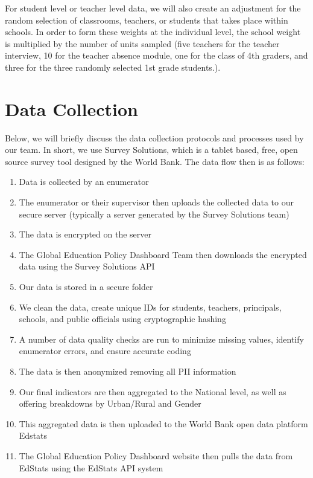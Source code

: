 \documentclass[]{article}
\providecommand{\tightlist}{%
  \setlength{\itemsep}{0pt}\setlength{\parskip}{0pt}}
\begin{document}
For student level or teacher level data, we will also create an
adjustment for the random selection of classrooms, teachers, or students
that takes place within schools. In order to form these weights at the
individual level, the school weight is multiplied by the number of units
sampled (five teachers for the teacher interview, 10 for the teacher
absence module, one for the class of 4th graders, and three for the
three randomly selected 1st grade students.).

\hypertarget{data-collection}{%
\section{Data Collection}\label{data-collection}}

Below, we will briefly discuss the data collection protocols and
processes used by our team. In short, we use Survey Solutions, which is
a tablet based, free, open source survey tool designed by the World
Bank. The data flow then is as follows:

\begin{enumerate}
\def\labelenumi{\arabic{enumi}.}
\tightlist
\item
  Data is collected by an enumerator\\
\item
  The enumerator or their supervisor then uploads the collected data to
  our secure server (typically a server generated by the Survey
  Solutions team)\\
\item
  The data is encrypted on the server\\
\item
  The Global Education Policy Dashboard Team then downloads the
  encrypted data using the Survey Solutions API
\item
  Our data is stored in a secure folder
\item
  We clean the data, create unique IDs for students, teachers,
  principals, schools, and public officials using cryptographic hashing
\item
  A number of data quality checks are run to minimize missing values,
  identify enumerator errors, and ensure accurate coding\\
\item
  The data is then anonymized removing all PII information\\
\item
  Our final indicators are then aggregated to the National level, as
  well as offering breakdowns by Urban/Rural and Gender\\
\item
  This aggregated data is then uploaded to the World Bank open data
  platform Edstats\\
\item
  The Global Education Policy Dashboard website then pulls the data from
  EdStats using the EdStats API system
\end{enumerate}
\end{document}
